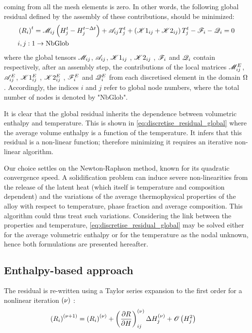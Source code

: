 coming from all the mesh elements is zero. In other words, the following global residual defined by 
the assembly of these contributions, should be minimized: 
\begin{align}
\begin{split}
\label{eq:discretise_residual_global}
& \left( R_i \right)^t = \mathscr{M}_{ij} \left( H_j^t - H_j^{t-\Delta t} \right) + \mathscr{A}_{ij} T_j^t + \left( \mathscr{K}1_{ij} + \mathscr{K}2_{ij} \right)T_j^t -\mathscr{F}_{i} - \mathscr{Q}_{i}=0 \\
& i,j:1 \rightarrow \text{NbGlob}
\end{split}
\end{align}
where the global tensors $\mathscr{M}_{ij}$, $\mathscr{A}_{ij}$, $\mathscr{K}1_{ij}$ , $\mathscr{K}2_{ij}$ , $\mathscr{F}_{i}$ and $\mathscr{Q}_{i}$ contain respectively, after an assembly step, 
the contributions of the local matrices $\mathscr{M}_{ij}^E$, $\mathscr{A}_{ij}^E$, $\mathscr{K}1_{ij}^E$ , $\mathscr{K}2_{ij}^E$ , $\mathscr{F}_{i}^E$ and $\mathscr{Q}_{i}^E$ from each discretised 
element in the domain $\Omega$. Accordingly, the indices $i$ and $j$ refer to global node numbers, where the total number of nodes is 
denoted by "NbGlob". 

It is clear that the global residual inherits the dependence between volumetric enthalpy and temperature. 
This is shown in \cref{eq:discretise_residual_global} where the average volume enthalpy is a function of the temperature. It infers that this residual 
is a non-linear function; therefore minimizing it requires an iterative non-linear algorithm. 

Our choice settles on the Newton-Raphson method, known for its quadratic convergence speed. A solidification problem can induce severe non-linearities 
from the release of the latent heat (which itself is temperature and composition dependent) and the variations of the average thermophysical 
properties of the alloy with respect to temperature, phase fraction and average composition. This algorithm could thus treat such variations. 
Considering the link between the properties and temperature, \cref{eq:discretise_residual_global} may be solved either for the average volumetric enthalpy 
or for the temperature as the nodal unknown, hence both formulations are presented hereafter.


\subsection{Enthalpy-based approach }

The residual is re-written using a Taylor series expansion to the first order for a nonlinear iteration ${\left( \nu \right)}$ :
\begin{align}
\label{eq:Hsolver_residual}
& \left( R_i \right)^{{\left( \nu+1 \right)}} = \left( R_i \right)^{{\left( \nu \right)}} + \left( \frac{\partial R}{\partial H} \right)^{{\left( \nu \right)}}_{ij} \Delta H_j^{{\left( \nu \right)}} + \mathscr{O}\left( H_j^2 \right)
\end{align}

